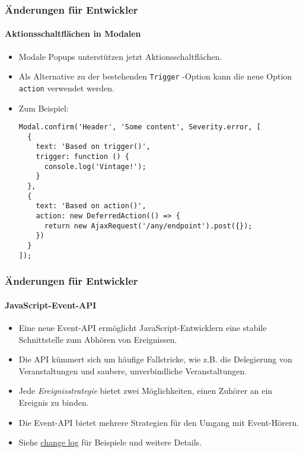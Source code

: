 
\begin{frame}[fragile]
	\frametitle{Änderungen für Entwickler}
	\framesubtitle{Aktionsschaltflächen in Modalen}

	\lstset{basicstyle=\tiny\ttfamily}

	\begin{itemize}
		\item Modale Popups unterstützen jetzt Aktionsschaltflächen.
		\item Als Alternative zu der bestehenden \texttt{Trigger} -Option kann die neue Option
			\texttt{action} verwendet werden.
		\item Zum Beispiel:

\vspace{-0.4cm}
\begin{lstlisting}
Modal.confirm('Header', 'Some content', Severity.error, [
  {
    text: 'Based on trigger()',
    trigger: function () {
      console.log('Vintage!');
    }
  },
  {
    text: 'Based on action()',
    action: new DeferredAction(() => {
      return new AjaxRequest('/any/endpoint').post({});
    })
  }
]);
\end{lstlisting}

	\end{itemize}

\end{frame}


\begin{frame}[fragile]
	\frametitle{Änderungen für Entwickler}
	\framesubtitle{JavaScript-Event-API}

	\begin{itemize}
		\item Eine neue Event-API ermöglicht JavaScript-Entwicklern eine stabile Schnittstelle zum Abhören von Ereignissen.
		\item Die API kümmert sich um häufige Fallstricke, wie z.B. die Delegierung von Veranstaltungen und saubere, unverbindliche Veranstaltungen.
		\item Jede \textit{Ereignisstrategie} bietet zwei Möglichkeiten, einen Zuhörer an ein Ereignis zu binden.
		\item Die Event-API bietet mehrere Strategien für den Umgang mit Event-Hörern.
		\item Siehe
			\href{https://docs.typo3.org/c/typo3/cms-core/master/en-us/Changelog/10.3/Feature-90471-JavaScriptEventAPI.html}{change log}
			für Beispiele und weitere Details.
	\end{itemize}

\end{frame}

